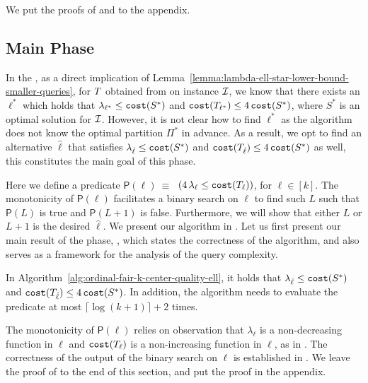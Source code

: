 We put the proofs of  and  to the appendix. 
 

\subsection{Main Phase}\label{sec:mainphase}
In the , 
as a direct implication of Lemma~\ref{lemma:lambda-ell-star-lower-bound-smaller-queries}, for $T$ obtained from \bcfrss on \ordfairkcen instance $\mathcal{I}$, we know that 
there exists an $\ell^*$ which holds that 
$\lambda_{\ell^*} \leq \texttt{cost}(S^*)$ and $\texttt{cost}(T_{\ell^*}) \leq 4\, \texttt{cost}(S^*)$, where $S^*$ is an optimal solution for $\mathcal{I}$.
However, it is not clear how to find $\ell^*$ as the algorithm does not know the optimal partition $\Pi^*$ in advance. 
As a result, we opt to find an alternative $\hat{\ell}$ that satisfies $\lambda_{\hat{\ell}} \leq \texttt{cost}(S^*)$ and $\texttt{cost}(T_{\hat{\ell}}) \leq 4\, \texttt{cost}(S^*)$ as well, this constitutes the main goal of this phase. 

Here we define a predicate $\mathsf{P}(\ell) ~\equiv~$ $( 4\,\lambda_{\ell} \leq \texttt{cost}(T_{\ell}))$, for $\ell\in[k]$. 
The monotonicity of $\mathsf{P}(\ell)$ facilitates a binary search on $\ell$ to find such $L$ such that $\mathsf{P}(L)$ is true and $\mathsf{P}(L+1)$ is false.
Furthermore, we will show that either $L$ or $L+1$ is the desired $\hat{\ell}$. 
We present our algorithm in . 
Let us first present our main result of the phase, , which states the correctness of the algorithm, and also serves as a framework for the analysis of the query complexity.


\begin{theorem}
    \label{lemma:binary-search-on-ell}
    In Algorithm~\ref{alg:ordinal-fair-k-center-quality-ell}, it holds that $\lambda_{\hat{\ell}} \leq \texttt{cost}(S^*)$ and $\texttt{cost}(T_{\hat{\ell}}) \leq 4\, \texttt{cost}(S^*)$.
    In addition, the algorithm needs to evaluate the predicate at most $\lceil \log(k+1) \rceil +2$ times.
\end{theorem}


The monotonicity of $\mathsf{P}(\ell)$ relies on observation that $\lambda_{\ell}$ is a non-decreasing function in $\ell$ and $\texttt{cost}(T_{\ell})$ is a non-increasing function in $\ell$, as in .
The correctness of the output of the binary search on $\ell$ is established in .
We leave the proof of  to the end of this section, and put the proof  in the appendix. 


